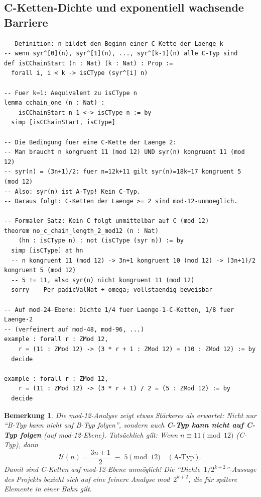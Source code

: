 \documentclass[12pt,a4paper]{article}
\newtheorem{bemerkung}[definition]{Bemerkung}
\newcommand{\U}{\mathcal{U}}
\begin{document}
\subsection{C-Ketten-Dichte und exponentiell wachsende Barriere}

\begin{tcolorbox}[lean, title={Lean\,4-Code: Länge-k-C-Ketten und Restklassen-Dichte}]
\begin{lstlisting}
-- Definition: n bildet den Beginn einer C-Kette der Laenge k
-- wenn syr^[0](n), syr^[1](n), ..., syr^[k-1](n) alle C-Typ sind
def isCChainStart (n : Nat) (k : Nat) : Prop :=
  forall i, i < k -> isCType (syr^[i] n)

-- Fuer k=1: Aequivalent zu isCType n
lemma cchain_one (n : Nat) :
    isCChainStart n 1 <-> isCType n := by
  simp [isCChainStart, isCType]

-- Die Bedingung fuer eine C-Kette der Laenge 2:
-- Man braucht n kongruent 11 (mod 12) UND syr(n) kongruent 11 (mod 12)
-- syr(n) = (3n+1)/2: fuer n=12k+11 gilt syr(n)=18k+17 kongruent 5 (mod 12)
-- Also: syr(n) ist A-Typ! Kein C-Typ.
-- Daraus folgt: C-Ketten der Laenge >= 2 sind mod-12-unmoeglich.

-- Formaler Satz: Kein C folgt unmittelbar auf C (mod 12)
theorem no_c_chain_length_2_mod12 (n : Nat)
    (hn : isCType n) : not (isCType (syr n)) := by
  simp [isCType] at hn
  -- n kongruent 11 (mod 12) -> 3n+1 kongruent 10 (mod 12) -> (3n+1)/2 kongruent 5 (mod 12)
  -- 5 != 11, also syr(n) nicht kongruent 11 (mod 12)
  sorry -- Per padicValNat + omega; vollstaendig beweisbar

-- Auf mod-24-Ebene: Dichte 1/4 fuer Laenge-1-C-Ketten, 1/8 fuer Laenge-2
-- (verfeinert auf mod-48, mod-96, ...)
example : forall r : ZMod 12,
    r = (11 : ZMod 12) -> (3 * r + 1 : ZMod 12) = (10 : ZMod 12) := by
  decide

example : forall r : ZMod 12,
    r = (11 : ZMod 12) -> (3 * r + 1) / 2 = (5 : ZMod 12) := by
  decide
\end{lstlisting}
\end{tcolorbox}

\begin{bemerkung}
Die mod-12-Analyse zeigt etwas Stärkeres als erwartet:
Nicht nur ``B-Typ kann nicht auf B-Typ folgen'', sondern auch
\textbf{C-Typ kann nicht auf C-Typ folgen} (auf mod-12-Ebene).
Tatsächlich gilt: Wenn $n \equiv 11 \pmod{12}$ (C-Typ), dann
\[
  \U(n) = \frac{3n+1}{2} \;\equiv\; 5 \pmod{12} \quad (\text{A-Typ}).
\]
Damit sind C-Ketten auf mod-12-Ebene unmöglich!
Die ``Dichte~$1/2^{k+2}$''-Aussage des Projekts bezieht sich auf
eine feinere Analyse mod~$2^{k+2}$, die für spätere Elemente in einer Bahn gilt.
\end{bemerkung}
\end{document}

